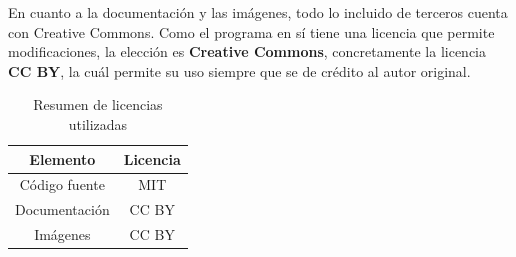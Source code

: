 En cuanto a la documentación y las imágenes, todo lo incluido de terceros cuenta con Creative Commons. 
Como el programa en sí tiene una licencia que permite modificaciones, la elección es \textbf{Creative Commons}, concretamente la licencia \textbf{CC BY}, la cuál permite su uso siempre que se de crédito al autor original.~\cite{cc_by_license}

\begin{table}[ht]
    \centering
    \begin{tabular}{cc}
        \toprule
         Elemento & Licencia\\
         \midrule
         Código fuente & MIT\\
         Documentación & CC BY\\
         Imágenes & CC BY \\
         \bottomrule
    \end{tabular}
    \caption{Resumen de licencias utilizadas}
\end{table}